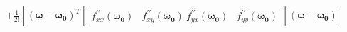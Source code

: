 \documentclass[preview]{standalone}
\begin{document}
\begin{align*}
+ \frac{1}{2 !}[ (\mathbf{\omega} - \mathbf{\omega_0})^T \begin{bmatrix} f_{xx}^{\prime \prime}(\mathbf{\omega_0}) & f_{xy}^{\prime \prime}(\mathbf{\omega_0}) \ f_{yx}^{\prime \prime}(\mathbf{\omega_0}) & f_{yy}^{\prime \prime}(\mathbf{\omega_0})\end{bmatrix} (\mathbf{\omega} - \mathbf{\omega_0})]
\end{align*}
\end{document}
